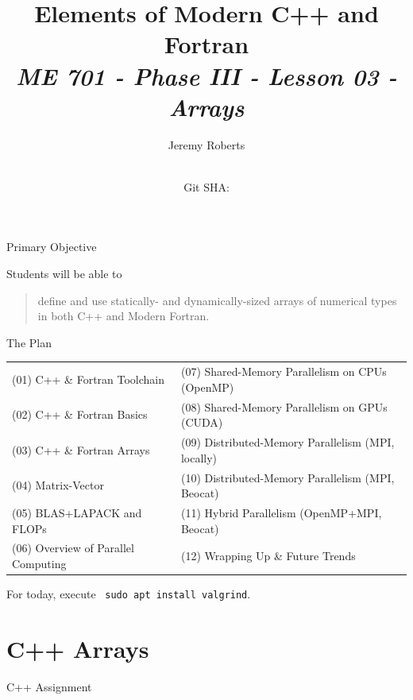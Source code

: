 \documentclass[aspectratio=1610]{beamer}
\title{Elements of Modern C++ and Fortran \\
       {\small\it ME 701 - Phase III - Lesson 03 - Arrays}}
\date{ \\ {\footnotesize Git SHA: }}
\author{Jeremy Roberts}
\begin{document}
\begin{frame}
\titlepage
\end{frame}
 
 
\begin{frame}{Primary Objective}

Students will be able to 

\vfill

\begin{quote}
\textcolor{wcprimary}{define and use statically- and dynamically-sized arrays of numerical types in both C++ and Modern Fortran.
}
\end{quote}

\vfill 

\end{frame}


\begin{frame}{The Plan}

{\small
\begin{tabular}{ll}
 (01) C++ \& Fortran Toolchain       & (07) Shared-Memory Parallelism on CPUs (OpenMP) \\
 (02) C++ \& Fortran Basics          & (08) Shared-Memory Parallelism on GPUs (CUDA) \\
 (03) C++ \& Fortran Arrays          & (09) Distributed-Memory Parallelism (MPI, locally) \\
 (04) Matrix-Vector                  & (10) Distributed-Memory Parallelism (MPI, Beocat) \\
 (05) BLAS+LAPACK and FLOPs          & (11) Hybrid Parallelism (OpenMP+MPI, Beocat) \ \\
 (06) Overview of Parallel Computing & (12) Wrapping Up \& Future Trends \\
\end{tabular}
}
\vfill 


For today, execute \, {\tt sudo apt install valgrind}.

\end{frame}


\section{C++ Arrays}

\begin{frame}[fragile]{C++ Assignment}
 
\end{frame}
\end{document}
